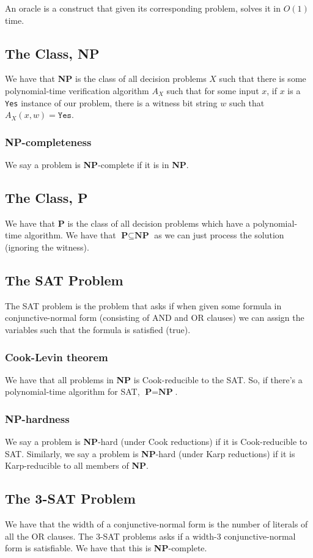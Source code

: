 \documentclass[a4paper, 12pt, twoside]{article}
\begin{document}
An oracle is a construct that given its corresponding problem, solves it in
$O(1)$ time.

\subsection{The Class, \textbf{NP}}

We have that \textbf{NP} is the class of all decision problems $X$ such that there is some
polynomial-time verification algorithm $A_X$ such that for some input $x$, 
if $x$ is a \texttt{Yes} instance of our problem, there is a witness bit string $w$
such that $A_X(x, w) = \texttt{Yes}$.

\subsubsection{\textbf{NP}-completeness}

We say a problem is \textbf{NP}-complete if it is in \textbf{NP}.

\subsection{The Class, \textbf{P}}

We have that \textbf{P} is the class of all decision problems which have a polynomial-time
algorithm. We have that $\textbf{P} \subseteq \textbf{NP}$ as we can just process the solution
(ignoring the witness).

\subsection{The SAT Problem}

The SAT problem is the problem that asks if when given some formula in conjunctive-normal form
(consisting of AND and OR clauses) we can assign the variables such that the formula is 
satisfied (true).

\subsubsection{Cook-Levin theorem}

We have that all problems in \textbf{NP} is Cook-reducible to the SAT. So, if there's
a polynomial-time algorithm for SAT, $\textbf{P} = \textbf{NP}$.

\subsubsection{\textbf{NP}-hardness}

We say a problem is \textbf{NP}-hard (under Cook reductions) if it is Cook-reducible to SAT.
Similarly, we say a problem is \textbf{NP}-hard (under Karp reductions) if it is Karp-reducible
to all members of \textbf{NP}.

\subsection{The 3-SAT Problem}

We have that the width of a conjunctive-normal form is the number of literals
of all the OR clauses. The 3-SAT problems asks if a width-3 conjunctive-normal 
form is satisfiable. We have that this is \textbf{NP}-complete.
\end{document}
